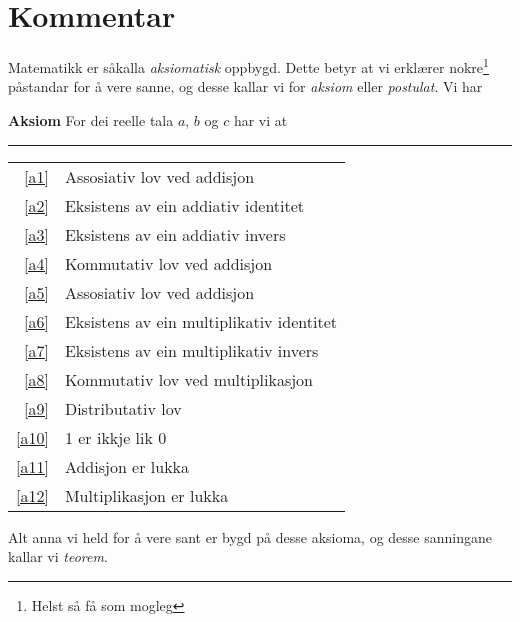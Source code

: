



\section{Kommentar}
Matematikk er såkalla \textit{aksiomatisk} oppbygd. Dette betyr at vi erklærer nokre\footnote{Helst så få som mogleg} påstandar for å vere sanne, og desse kallar vi for \textit{aksiom} eller \textit{postulat}. Vi har
\begin{tcolorbox}[boxrule=0.3 mm,arc=0mm,colback=blue!5] \large \textbf{Aksiom} \vspace{5 pt}\newline
For dei reelle tala $ a $, $ b $ og $ c $ har vi at
 \vsb \vsb \vs \vspace{-7pt}
\rule{1\linewidth}{0.75bp}
\begin{center}
	\begin{tabular}{rl}
		\eqref{a1} &Assosiativ lov ved addisjon\\
		\eqref{a2} & Eksistens av ein addiativ identitet \\
		\eqref{a3} & Eksistens av ein addiativ invers \\	
		\eqref{a4} & Kommutativ lov ved addisjon \\	
		\eqref{a5} & Assosiativ lov ved addisjon \\
		\eqref{a6} & Eksistens av ein multiplikativ identitet \\	
		\eqref{a7} &  Eksistens av ein multiplikativ invers\\
		\eqref{a8} & Kommutativ lov ved multiplikasjon\\	
		\eqref{a9} & Distributativ lov\\
		\eqref{a10} & 1 er ikkje lik 0\\
		\eqref{a11} &Addisjon er lukka \\
		\eqref{a12} & Multiplikasjon er lukka	
	\end{tabular}
\end{center}
\end{tcolorbox}


Alt anna vi held for å vere sant er bygd på desse aksioma, og desse sanningane kallar vi \textit{teorem}. 


